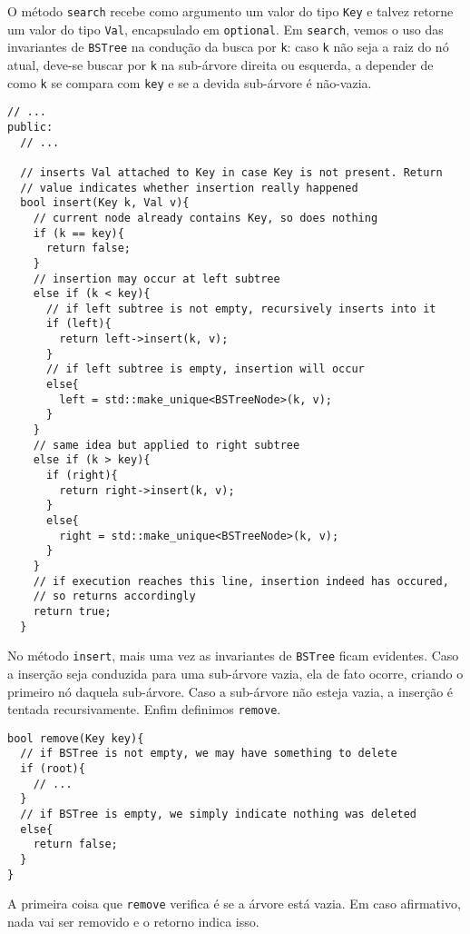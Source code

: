 \documentclass[11pt]{article}
\begin{document}
O método \texttt{search} recebe como argumento um valor do tipo \texttt{Key} e
talvez retorne um valor do tipo \texttt{Val}, encapsulado em \texttt{optional}.
Em \texttt{search}, vemos o uso das invariantes de \texttt{BSTree} na condução
da busca por \texttt{k}: caso \texttt{k} não seja a raiz do nó atual, deve-se
buscar por \texttt{k} na sub-árvore direita ou esquerda, a depender de
como \texttt{k} se compara com \texttt{key} e se a devida sub-árvore é
não-vazia.

\pagebreak

\begin{verbatim}
// ...
public:
  // ...

  // inserts Val attached to Key in case Key is not present. Return
  // value indicates whether insertion really happened
  bool insert(Key k, Val v){
    // current node already contains Key, so does nothing
    if (k == key){
      return false;
    }
    // insertion may occur at left subtree
    else if (k < key){
      // if left subtree is not empty, recursively inserts into it
      if (left){
        return left->insert(k, v);
      }
      // if left subtree is empty, insertion will occur
      else{
        left = std::make_unique<BSTreeNode>(k, v);
      }
    }
    // same idea but applied to right subtree
    else if (k > key){
      if (right){
        return right->insert(k, v);
      }
      else{
        right = std::make_unique<BSTreeNode>(k, v);
      }
    }
    // if execution reaches this line, insertion indeed has occured,
    // so returns accordingly
    return true;
  }
\end{verbatim}

No método \texttt{insert}, mais uma vez as invariantes de \texttt{BSTree} ficam
evidentes.  Caso a inserção seja conduzida para uma sub-árvore
vazia, ela de fato ocorre, criando o primeiro nó daquela
sub-árvore. Caso a sub-árvore não esteja vazia, a inserção é
tentada recursivamente.  Enfim definimos \texttt{remove}.

\pagebreak

\begin{verbatim}
bool remove(Key key){
  // if BSTree is not empty, we may have something to delete
  if (root){
    // ...
  }
  // if BSTree is empty, we simply indicate nothing was deleted
  else{
    return false;
  }
}
\end{verbatim}

A primeira coisa que \texttt{remove} verifica é se a árvore está vazia.
Em caso afirmativo, nada vai ser removido e o retorno indica isso.
\end{document}
